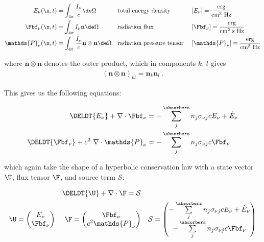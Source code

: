 \begin{align}
	E_\nu (\x, t) &= \int_{4 \pi} \frac{I_\nu}{c} \de \Omega
			&& \text{total energy density }
			&& [E_\nu] = \frac{\text{erg}}{\text{cm}^3 \text{ Hz}}\\
	\Fbf_\nu(\x, t) &= \int_{4 \pi}  I_\nu \mathbf{n} \de \Omega
			&& \text{radiation flux }
			&& [\Fbf_\nu] = \frac{\text{erg}}{\text{cm}^2 \text{ s Hz}}\\
	\mathds{P}_\nu (\x, t) &= \int_{4 \pi} \frac{I_\nu}{c} \mathbf{n} \otimes \mathbf{n} \de \Omega
			&& \text{radiation pressure tensor }
			&& [\mathds{P}_\nu ] = \frac{\text{erg}}{\text{cm}^3 \text{ Hz}}
\end{align}

where $\mathbf{n} \otimes \mathbf{n}$ denotes the outer product, which in components $k$, $l$ gives
%
\begin{align*}
 (\mathbf{n} \otimes \mathbf{n})_{kl} = \mathbf{n}_k \mathbf{n}_l \ .
\end{align*}



This gives us the following equations:


\begin{align}
	\DELDT{E_\nu} + \nabla \cdot \Fbf_\nu &=
		- \sum\limits_{j}^{\absorbers} n_j \sigma_{\nu j} c E_\nu + \dot{E}_\nu
		\label{eq:dEdt-freq} \\
	\DELDT{\Fbf_\nu} + c^2 \ \nabla \cdot \mathds{P}_\nu &=
		- \sum\limits_{j}^{\absorbers} n_j \sigma_{\nu j} c \Fbf_\nu
		\label{eq:dFdt-freq}
\end{align}

which again take the shape of a hyperbolic conservation law with a state vector $\U$, flux tensor
$\F$, and source term $\mathcal{S}$:

\begin{align}
&&
    \DELDT{\U} + \nabla \cdot \F = \mathcal{S}
&&
\\
    \U = \begin{pmatrix}
          E_\nu \\ \Fbf_\nu
         \end{pmatrix}
&&
    \F = \begin{pmatrix}
            \Fbf_\nu \\ c^2 \mathds{P}_\nu
         \end{pmatrix}
&&
    \mathcal{S} = \begin{pmatrix}
		- \sum\limits_{j}^{\absorbers} n_j \sigma_{\nu j} c E_\nu + \dot{E}_\nu \\
		- \sum\limits_{j}^{\absorbers} n_j \sigma_{\nu j} c \Fbf_\nu
         \end{pmatrix}
\end{align}


